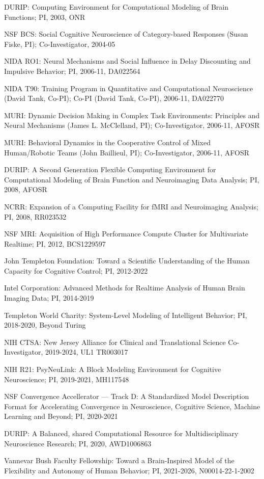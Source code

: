 \documentclass[10 pt]{article}
\begin{document}
DURIP:
Computing Environment for Computational Modeling of Brain Functions;
PI,
2003,
ONR

NSF BCS:
Social Cognitive Neuroscience of Category-based Responses (Susan Fiske, PI);
Co-Investigator,
2004-05

NIDA RO1:
Neural Mechanisms and Social Influence in Delay Discounting and Impulsive Behavior;
PI,
2006-11,
DA022564

NIDA T90:
Training Program in Quantitative and Computational Neuroscience (David Tank, Co-PI);
Co-PI (David Tank, Co-PI),
2006-11,
DA022770

MURI:
Dynamic Decision Making in Complex Task Environments: Principles and Neural Mechanisms (James L. McClelland, PI);
Co-Investigator,
2006-11,
AFOSR

MURI:
Behavioral Dynamics in the Cooperative Control of Mixed Human/Robotic Teams (John Baillieul, PI);
Co-Investigator,
2006-11,
AFOSR

DURIP:
A Second Generation Flexible Computing Environment for Computational Modeling of Brain Function and Neuroimaging
Data Analysis;
PI,
2008,
AFOSR

NCRR:
Expansion of a Computing Facility for fMRI and Neuroimaging Analysis;
PI,
2008,
RR023532

NSF MRI:
Acquisition of High Performance Compute Cluster for Multivariate Realtime;
PI,
2012,
BCS1229597

John Templeton Foundation:
Toward a Scientific Understanding of the Human Capacity for Cognitive Control;
PI,
2012-2022

Intel Corporation:
Advanced Methods for Realtime Analysis of Human Brain Imaging Data;
PI,
2014-2019

Templeton World Charity:
System-Level Modeling of Intelligent Behavior;
PI,
2018-2020,
Beyond Turing

NIH CTSA:
New Jersey Alliance for Clinical and Translational Science
Co-Investigator,
2019-2024,
UL1 TR003017

NIH R21:
PsyNeuLink: A Block Modeling Environment for Cognitive Neuroscience;
PI,
2019-2021,
MH117548

NSF Convergence Accellerator — Track D:
A Standardized Model Description Format for Accelerating Convergence in Neuroscience, Cognitive Science, Machine
Learning and Beyond;
PI,
2020-2021

DURIP:
A Balanced, shared Computational Resource for Multidisciplinary Neuroscience Research;
PI,
2020,
AWD1006863

Vannevar Bush Faculty Fellowship:
Toward a Brain-Inspired Model of the Flexibility and Autonomy of Human Behavior;
PI,
2021-2026,
N00014-22-1-2002
\end{document}
